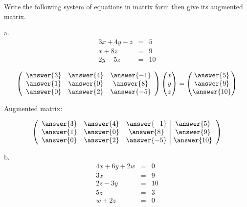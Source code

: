 \documentclass{ximera}
\author{Parisa Fatheddin}
\begin{document}
\begin{exercise}

Write the following system of equations in matrix form then give its augmented matrix.

a.
\begin{eqnarray*}
3x+ 4y -z &=& 5\\
x + 8z&=&9 \\
2y -5z &=& 10
\end{eqnarray*}

\begin{prompt}
\begin{equation*}
\left(\begin{array}{ccc}
\answer{3} & \answer{4} & \answer{-1} \\
\answer{1} & \answer{0} & \answer{8}\\
\answer{0} & \answer{2} & \answer{-5}
\end{array}\right) \begin{pmatrix}
x \\
y\\
z
\end{pmatrix} = \begin{pmatrix} \answer{5}\\
\answer{9}\\
\answer{10}
\end{pmatrix}
\end{equation*}

Augmented matrix:

\[\left(\begin{array}{ccc|c}
\answer{3} & \answer{4} & \answer{-1} & \answer{5}\\
\answer{1} & \answer{0} & \answer{8} & \answer{9}\\
\answer{0} & \answer{2} & \answer{-5} & \answer{10}
\end{array}\right)\]
\end{prompt}

b.
\begin{eqnarray*}
4x + 6y +2w &=& 0\\
3x &=& 9\\
2z -3y &=& 10\\
5z &=& 3\\
w + 2z &=& 0
\end{eqnarray*}


\end{exercise}
\end{document}
